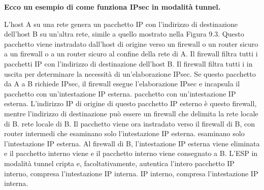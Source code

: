 \singlespacing

\textbf{Ecco un esempio di come funziona IPsec in modalità tunnel.}

\singlespacing

L'host A su una rete genera un pacchetto IP con l'indirizzo di destinazione dell'host B su un'altra rete, simile a quello mostrato nella Figura 9.3. Questo pacchetto viene instradato dall'host di origine verso un firewall o un router sicuro a un firewall o a un router sicuro al confine della rete di A. Il firewall filtra tutti i pacchetti IP con l'indirizzo di destinazione dell'host B. Il firewall filtra tutti i in uscita per determinare la necessità di un'elaborazione IPsec. Se questo pacchetto da A a B richiede IPsec, il firewall esegue l'elaborazione IPsec e incapsula il pacchetto con un'intestazione IP esterna. pacchetto con un'intestazione IP esterna. L'indirizzo IP di origine di questo pacchetto IP esterno è questo firewall, mentre l'indirizzo di destinazione può essere un firewall che delimita la rete locale di B. rete locale di B. Il pacchetto viene ora instradato verso il firewall di B, con router intermedi che esaminano solo l'intestazione IP esterna. esaminano solo l'intestazione IP esterna. Al firewall di B, l'intestazione IP esterna viene eliminata e il pacchetto interno viene e il pacchetto interno viene consegnato a B. L'ESP in modalità tunnel cripta e, facoltativamente, autentica l'intero pacchetto IP interno, compresa l'intestazione IP interna. IP interno, compresa l'intestazione IP interna.

